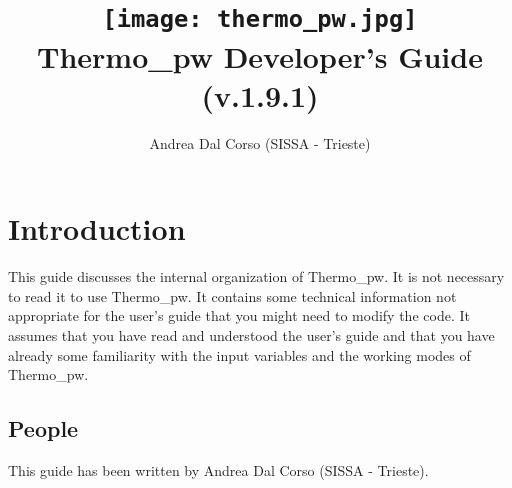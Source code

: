 \documentclass[12pt,a4paper,twoside]{report}
\def\version{1.9.1}
\def\tpw{{\sc Thermo}\_{\sc pw}}
\begin{document}
 

\author{Andrea Dal Corso (SISSA - Trieste)}
\date{}

\title{
  \texttt{[image: thermo\_pw.jpg]} \\
  \vspace{3truecm}
  \Huge \color{dark-blue} {\sc Thermo}\_{\sc pw} Developer's Guide \\
  (v.\version)
}

\maketitle

\newpage

\tableofcontents

\newpage

{\color{dark-blue}\chapter{Introduction}}
\color{black}
This guide discusses the internal organization of \tpw. It is not necessary
to read it to use \tpw. It contains some technical information not 
appropriate for the user's guide that you might need to modify the code.
It assumes that you have read and understood the user's guide and that
you have already some familiarity with the input variables and 
the working modes of \tpw.

{\color{coral}\section{People}}
\color{black}
This guide has been written by Andrea Dal Corso (SISSA - Trieste). 
\end{document}

